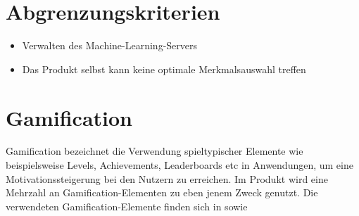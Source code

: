 \documentclass[a4paper]{scrreprt}
\begin{document}
    \section{Abgrenzungskriterien}
    \begin{itemize}
        \item Verwalten des Machine-Learning-Servers 
	\item Das Produkt selbst kann keine optimale Merkmalsauswahl treffen 
    \end{itemize}

    \section{Gamification}
    \label{sec:gamification}
    Gamification bezeichnet die Verwendung spieltypischer Elemente wie beispielsweise Levels, Achievements, Leaderboards etc in Anwendungen, um eine Motivationssteigerung bei den Nutzern zu erreichen.
    Im \Gls{Produkt} wird eine Mehrzahl an Gamification-Elementen zu eben jenem Zweck genutzt.
    Die verwendeten Gamification-Elemente finden sich in  sowie 
\end{document}
